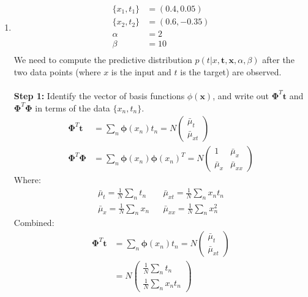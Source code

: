 \documentclass[a4paper,10pt]{article}
\numberwithin{equation}{section} %
\numberwithin{figure}{section} %
\numberwithin{table}{section} %
\theoremstyle{mytheor}
\begin{document}
\begin{enumerate}
	\item \begin{align}
		\{x_1,t_1\} &= (0.4, 0.05)\\
		\{x_2,t_2\} &= (0.6, -0.35)\\
		\alpha &= 2\\
		\beta &= 10\\
		\end{align}
		\noindent We need to compute the predictive distribution $p(t | x,\boldsymbol{t},\boldsymbol{x}, \alpha, \beta)$ after the two data points (where $x$ is the input and $t$ is the target) are observed.\\\\
		\textbf{Step 1:} Identify the vector of basis functions $\phi(\boldsymbol{x})$, and write out $\boldsymbol{\Phi}^T\boldsymbol{t}$ and $\boldsymbol{\Phi}^T\boldsymbol{\Phi}$ in terms of the data $\{x_n,t_n\}$.
		\begin{align}
		\boldsymbol{\Phi}^T\boldsymbol{t} &= \sum_n \boldsymbol{\phi}(x_n)t_n = N\begin{pmatrix} \bar{\mu}_t \\ \bar{\mu}_{xt}\end{pmatrix}\\
		\boldsymbol{\Phi}^T\boldsymbol{\Phi} &= \sum_n \boldsymbol{\phi}(x_n)\boldsymbol{\phi}(x_n)^T = N\begin{pmatrix} 1 & \bar{\mu}_x \\ \bar{\mu}_x & \bar{\mu}_{xx} \end{pmatrix}
		\end{align}
		Where: 
		\begin{align*}
		\bar{\mu}_t = \frac{1}{N} \sum_n t_n  & &  \bar{\mu}_{xt} = \frac{1}{N} \sum_n x_nt_n \\
		\bar{\mu}_x = \frac{1}{N} \sum_n x_n & & \bar{\mu}_{xx} = \frac{1}{N} \sum_n x_n^2
		\end{align*}
		Combined:
		\begin{align}
		\boldsymbol{\Phi}^T\boldsymbol{t} &= \sum_n \boldsymbol{\phi}(x_n)t_n = N\begin{pmatrix} \bar{\mu}_t \\ \bar{\mu}_{xt}\end{pmatrix}\\
		& = N\begin{pmatrix} \frac{1}{N} \sum_n t_n \\ \frac{1}{N} \sum_n x_nt_n\end{pmatrix} \\

\end{align}
\end{enumerate}
\end{document}

